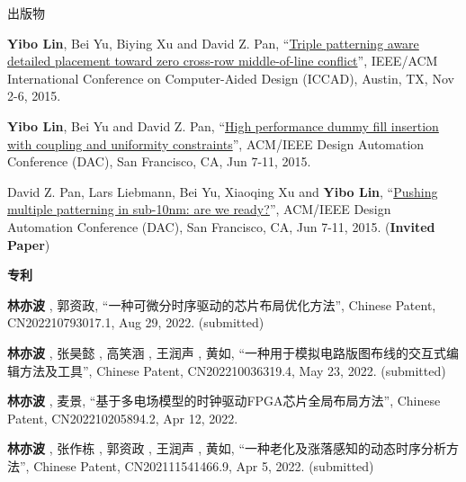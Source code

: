 \begin{rSection}{出版物}
\begin{description}[font=\normalfont, rightmargin=2em]
{}
            

\item[{[C3]}]{
        \textbf{Yibo Lin}, Bei Yu, Biying Xu and David Z. Pan, 
    ``\href{http://dl.acm.org/citation.cfm?id=2840875}{Triple patterning aware detailed placement toward zero cross-row middle-of-line conflict}'', 
    IEEE/ACM International Conference on Computer-Aided Design (ICCAD), Austin, TX, Nov 2-6, 2015.
    
}
            

\item[{[C2]}]{
        \textbf{Yibo Lin}, Bei Yu and David Z. Pan, 
    ``\href{http://dl.acm.org/citation.cfm?id=2744769.2744850}{High performance dummy fill insertion with coupling and uniformity constraints}'', 
    ACM/IEEE Design Automation Conference (DAC), San Francisco, CA, Jun 7-11, 2015.
    
}
            

\item[{[C1]}]{
        David Z. Pan, Lars Liebmann, Bei Yu, Xiaoqing Xu and \textbf{Yibo Lin}, 
    ``\href{http://dl.acm.org/citation.cfm?id=2744769.2747940}{Pushing multiple patterning in sub-10nm: are we ready?}'', 
    ACM/IEEE Design Automation Conference (DAC), San Francisco, CA, Jun 7-11, 2015.
    (\textbf{Invited Paper})
}
            

\end{description}
    

\textbf{专利}
        

\begin{description}[font=\normalfont, rightmargin=2em]
    

\item[{[P10]}]{
        \textbf{林亦波} ,  郭资政, 
    ``一种可微分时序驱动的芯片布局优化方法'', 
    Chinese Patent, CN202210793017.1, Aug 29, 2022.
    (submitted)
}
            

\item[{[P9]}]{
        \textbf{林亦波} ,  张昊懿 ,  高笑涵 ,  王润声 ,  黄如, 
    ``一种用于模拟电路版图布线的交互式编辑方法及工具'', 
    Chinese Patent, CN202210036319.4, May 23, 2022.
    (submitted)
}
            

\item[{[P8]}]{
        \textbf{林亦波} ,  麦景, 
    ``基于多电场模型的时钟驱动FPGA芯片全局布局方法'', 
    Chinese Patent, CN202210205894.2, Apr 12, 2022.
    
}
            

\item[{[P7]}]{
        \textbf{林亦波} ,  张作栋 ,  郭资政 ,  王润声 ,  黄如, 
    ``一种老化及涨落感知的动态时序分析方法'', 
    Chinese Patent, CN202111541466.9, Apr 5, 2022.
    (submitted)
}
            


\end{description}
\end{rSection}
